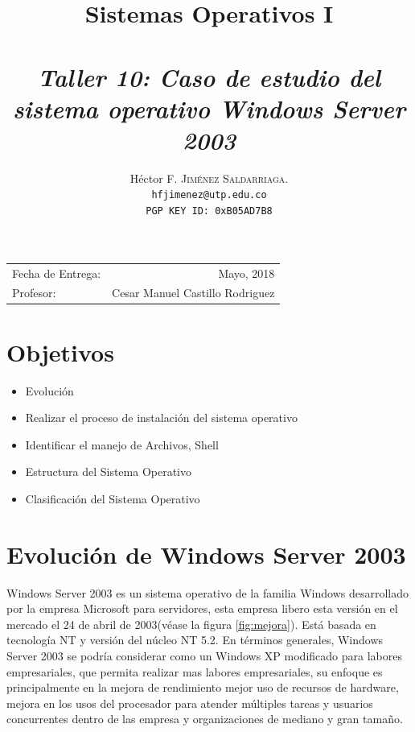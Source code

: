 \documentclass[paper=a4, fontsize=12pt]{article} 		%
\title{Sistemas Operativos I\\ 
\horrule{0.5pt} \\[0.4cm] 								%
\textit{Taller 10: Caso de estudio del sistema operativo Windows Server 2003}
\horrule{1pt} \\[0.5cm] 			
}
\author{												
Héctor F. \textsc{Jiménez Saldarriaga.}\\				%
\texttt{hfjimenez@utp.edu.co} \\						
\texttt{PGP KEY ID: 0xB05AD7B8}
}
\date{}    						                       %
\numberwithin{equation}{section}						%
\numberwithin{table}{section} 							%
\begin{document}
\maketitle                      			           %
\begin{center}
\begin{tabular}{l r}								   %
Fecha de Entrega: & Mayo, 2018 \\				   	   %
Profesor: & Cesar Manuel Castillo Rodriguez
\end{tabular}
\end{center}
\section{Objetivos}
\begin{itemize}
	\item Evolución
	\item Realizar el proceso de instalación del sistema operativo	
    \item Identificar el manejo de Archivos, Shell
    \item Estructura del Sistema Operativo
    \item Clasificación del Sistema Operativo
\end{itemize}
\section{Evolución de Windows Server 2003} 
Windows Server 2003 es un sistema operativo de la familia Windows desarrollado por la empresa Microsoft para servidores, esta empresa libero esta versión en el mercado el 24 de abril de 2003(véase la figura \ref{fig:mejora}). Está basada en tecnología NT y versión del núcleo NT 5.2. En términos generales, Windows Server 2003 se podría considerar como un Windows XP modificado para labores empresariales, que permita realizar mas labores empresariales,  su enfoque es principalmente en la mejora de rendimiento mejor uso de recursos de hardware, mejora en los usos del procesador para atender múltiples tareas y usuarios concurrentes dentro de las empresa y organizaciones de mediano y gran tamaño.
\end{document}
